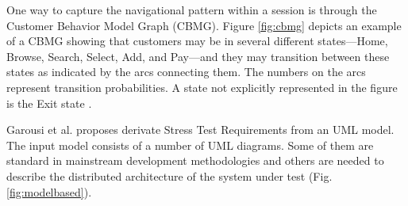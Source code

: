 \documentclass{report}
\begin{document}
One way to capture the navigational pattern within a session is through the Customer Behavior Model Graph (CBMG). Figure \ref{fig:cbmg} depicts an example of a CBMG showing that customers may be in several different states—Home, Browse, Search, Select, Add, and Pay—and they may transition between these states as indicated by the arcs connecting them. The numbers on the arcs represent transition probabilities. A state not explicitly represented in the figure is the Exit state \cite{Menasce2002a} \cite{Jiang2010} \cite{MohammadS.Obaidat}. 


Garousi et al. proposes derivate Stress Test Requirements from an UML model. The input model consists of a number of UML diagrams. Some of
them are standard in mainstream development methodologies and others are needed to describe the distributed architecture of the system under test (Fig. \ref{fig:modelbased}).
\end{document}
